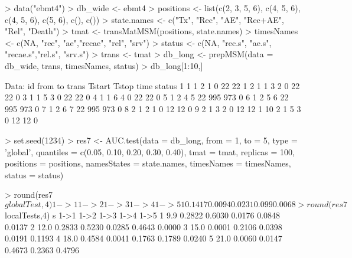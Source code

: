 \begin{example}
> data("ebmt4")
> db_wide <- ebmt4
> positions <- list(c(2, 3, 5, 6), c(4, 5, 6), c(4, 5, 6),
                 c(5, 6), c(), c())
> state.names <-  c("Tx", "Rec", "AE", "Rec+AE", "Rel",  "Death")
> tmat <- transMatMSM(positions, state.names)
> timesNames <- c(NA, "rec", "ae","recae", "rel", "srv")
> status <- c(NA, "rec.s", "ae.s", "recae.s","rel.s", "srv.s")
> trans <- tmat
> db_long <- prepMSM(data = db_wide, trans, timesNames, status)
> db_long[1:10,]

Data:
   id from to trans Tstart Tstop time status
1   1    1  2     1      0    22   22      1
2   1    1  3     2      0    22   22      0
3   1    1  5     3      0    22   22      0
4   1    1  6     4      0    22   22      0
5   1    2  4     5     22   995  973      0
6   1    2  5     6     22   995  973      0
7   1    2  6     7     22   995  973      0
8   2    1  2     1      0    12   12      0
9   2    1  3     2      0    12   12      1
10  2    1  5     3      0    12   12      0

> set.seed(1234)
> res7 <- AUC.test(data = db_long, from = 1, to = 5, type = 'global',
        quantiles = c(0.05, 0.10, 0.20, 0.30, 0.40),
        tmat = tmat, replicas = 100,
        positions = positions, namesStates = state.names,
        timesNames = timesNames, status = status)
        
        
                  
> round(res7$globalTest, 4)
    1->1    1->2    1->3   1->4    1->5
1  0.1417 0.0094 0.0231 0.099 0.0068

> round(res7$localTests,4)
     s   1->1   1->2   1->3   1->4   1->5
1  9.9 0.2822 0.6030 0.0176 0.0848 0.0137
2 12.0 0.2833 0.5230 0.0285 0.4643 0.0000
3 15.0 0.0001 0.2106 0.0398 0.0191 0.1193
4 18.0 0.4584 0.0041 0.1763 0.1789 0.0240
5 21.0 0.0060 0.0147 0.4673 0.2363 0.4796
\end{example}



